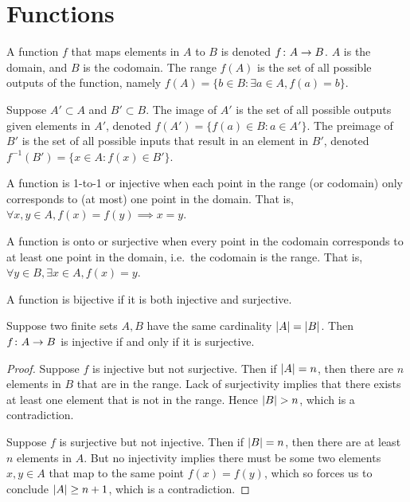 \section{Functions}

\begin{definition}
    A function \(f\) that maps elements in \(A\) to \(B\)
    is denoted \(f\colon A\to B\).
    \(A\) is the domain, and \(B\) is the codomain.
    The range \(f(A)\) is the set of all possible outputs of the function,
    namely \(f(A) = \{b \in B : \exists a \in A, f(a) = b\}\).
\end{definition}

\begin{definition}
    Suppose \(A' \subset A\) and \(B' \subset B\).
    The image of \(A'\) is the set of all possible outputs
    given elements in \(A'\),
    denoted \(f(A') = \{f(a) \in B : a \in A'\}\).
    The preimage of \(B'\) is the set of all possible inputs
    that result in an element in \(B'\),
    denoted \(f^{-1}(B') = \{x \in A : f(x) \in B'\}\).
\end{definition}

\begin{definition}
    A function is 1-to-1 or injective
    when each point in the range (or codomain)
    only corresponds to (at most) one point in the domain.
    That is, \(\forall x,y \in A, f(x) = f(y) \implies x = y\).
\end{definition}
\begin{definition}
    A function is onto or surjective
    when every point in the codomain
    corresponds to at least one point in the domain,
    i.e.\ the codomain is the range.
    That is, \(\forall y \in B, \exists x \in A, f(x) = y\).
\end{definition}
\begin{definition}
    A function is bijective if it is both injective and surjective.
\end{definition}


\begin{theorem}\label{thm:pigeonhole}
    Suppose two finite sets \(A,B\) have the same cardinality
    \(\abs{A} = \abs{B}\).
    Then \(f\colon A\to B\) is injective
    if and only if it is surjective.
\end{theorem}
\begin{proof}
    Suppose \(f\) is injective but not surjective.
    Then if \(\abs{A} = n\),
    then there are \(n\) elements in \(B\) that are in the range.
    Lack of surjectivity implies that
    there exists at least one element that is not in the range.
    Hence \(\abs{B} > n\), which is a contradiction.

    Suppose \(f\) is surjective but not injective.
    Then if \(\abs{B} = n\),
    then there are at least \(n\) elements in \(A\).
    But no injectivity implies there must be some two elements
    \(x,y \in A\) that map to the same point \(f(x) = f(y)\),
    which so forces us to conclude \(\abs{A} \geq n+1\),
    which is a contradiction.
\end{proof}

